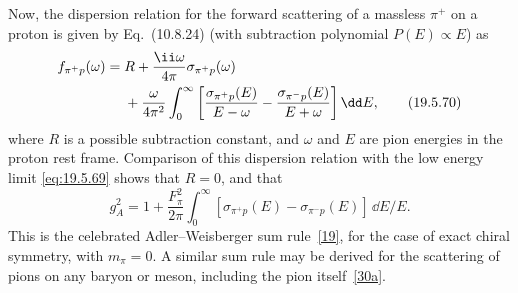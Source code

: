 Now, the dispersion relation for the forward scattering of a massless $\pi^+$ on a proton is given by Eq.~(10.8.24) (with subtraction polynomial $P(E)\propto E$) as
\begin{align}
f_{\pi^+p}(\omega)
={}&R+\frac{\ii\omega}{4\pi}\sigma_{\pi^+p}(\omega)
\notag\\
&+\frac{\omega}{4\pi^2}\int_0^\infty
\left[
\frac{\sigma_{\pi^+p}(E)}{E-\omega}
-\frac{\sigma_{\pi^-p}(E)}{E+\omega}
\right]\dd E,
\tag{19.5.70}\label{eq:19.5.70}
\end{align}
where $R$ is a possible subtraction constant, and $\omega$ and $E$ are pion energies in the proton rest frame. Comparison of this dispersion relation with the low energy limit \eqref{eq:19.5.69} shows that $R=0$, and that
\begin{equation}
g_A^2
=1+\frac{F_\pi^2}{2\pi}\int_0^\infty
[\sigma_{\pi^+p}(E)-\sigma_{\pi^-p}(E)]\,\dd E/E.
\tag{19.5.71}\label{eq:19.5.71}
\end{equation}
This is the celebrated Adler--Weisberger sum rule~\hyperref[ch19-ref-19]{[19]}, for the case of exact chiral symmetry, with $m_\pi=0$. A similar sum rule may be derived for the scattering of pions on any baryon or meson, including the pion itself~\hyperref[ch19-ref-30a]{[30a]}.
